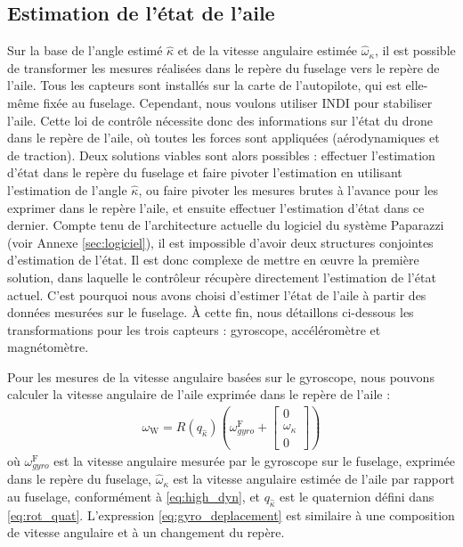 \subsection{Estimation de l'état de l'aile}

Sur la base de l'angle estimé $\hat{\kappa}$ et de la vitesse angulaire estimée $\hat{\omega}_{\kappa}$, il est possible de transformer les mesures réalisées dans le repère du fuselage vers le repère de l'aile. Tous les capteurs sont installés sur la carte de l'autopilote, qui est elle-même fixée au fuselage. Cependant, nous voulons utiliser INDI pour stabiliser l'aile. Cette loi de contrôle nécessite donc des informations sur l'état du drone dans le repère de l'aile, où toutes les forces sont appliquées (aérodynamiques et de traction).
Deux solutions viables sont alors possibles : effectuer l'estimation d'état dans le repère du fuselage et faire pivoter l'estimation en utilisant l'estimation de l'angle $\hat{\kappa}$, ou faire pivoter les mesures brutes à l'avance pour les exprimer dans le repère l'aile, et ensuite effectuer l'estimation d'état dans ce dernier. 
Compte tenu de l'architecture actuelle du logiciel du système Paparazzi (voir Annexe \ref{sec:logiciel}), il est impossible d'avoir deux structures conjointes d'estimation de l'état. Il est donc complexe de mettre en œuvre la première solution, dans laquelle le contrôleur récupère directement l'estimation de l'état actuel. C'est pourquoi nous avons choisi d'estimer l'état de l'aile à partir des données mesurées sur le fuselage. À cette fin, nous détaillons ci-dessous les transformations pour les trois capteurs : gyroscope, accéléromètre et magnétomètre. 

Pour les mesures de la vitesse angulaire basées sur le gyroscope, nous pouvons calculer la vitesse angulaire de l'aile exprimée dans le repère de l'aile :
\begin{align}
    \label{eq:gyro_deplacement}
    \omega_{\text{W}} = R(q_{\hat{\kappa}}) \left( \omega_{gyro}^{\text{F}} + \begin{bmatrix}
    0\\ \omega_{\kappa} \\ 0
    \end{bmatrix}  \right) 
\end{align}
où $\omega_{gyro}^{\text{F}}$ est la vitesse angulaire mesurée par le gyroscope sur le fuselage, exprimée dans le repère du fuselage, $\hat{\omega}_{\kappa}$ est la vitesse angulaire estimée de l'aile par rapport au fuselage, conformément à \eqref{eq:high_dyn}, et $q_{\hat{\kappa}}$ est le quaternion défini dans \eqref{eq:rot_quat}.
L'expression \eqref{eq:gyro_deplacement} est similaire à une composition de vitesse angulaire et à un changement du repère.

